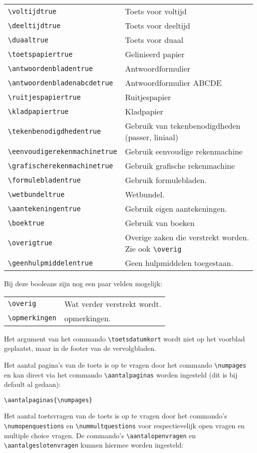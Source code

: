 \documentclass[12pt,dutch,addpoints,fleqn]{tisdexam}
\begin{document}
\begin{tabular}{lp{10cm}}
\verb|\voltijdtrue| & Toets voor voltijd \\
\verb|\deeltijdtrue| & Toets voor deeltijd \\
\verb|\duaaltrue| & Toets voor duaal \\
\verb|\toetspapiertrue| & Gelinieerd papier \\
\verb|\antwoordenbladentrue| & Antwoordformulier \\
\verb|\antwoordenbladenabcdetrue| & Antwoordformulier ABCDE \\
\verb|\ruitjespapiertrue| & Ruitjespapier \\
\verb|\kladpapiertrue| & Kladpapier \\
\verb|\tekenbenodigdhedentrue| & Gebruik van tekenbenodigdheden (passer, liniaal) \\
\verb|\eenvoudigerekenmachinetrue| & Gebruik eenvoudige rekenmachine \\ 
\verb|\grafischerekenmachinetrue| & Gebruik grafische rekenmachine \\
\verb|\formulebladentrue| & Gebruik formulebladen. \\
\verb|\wetbundeltrue| & Wetbundel. \\
\verb|\aantekeningentrue| & Gebruik eigen aantekeningen. \\
\verb|\boektrue| & Gebruik van boeken  \\
\verb|\overigtrue| & Overige zaken die verstrekt worden. Zie ook \verb|\overig| \\
\verb|\geenhulpmiddelentrue| & Geen hulpmiddelen toegestaan.
\end{tabular}


Bij deze booleans zijn nog een paar velden mogelijk:

\begin{tabular}{lp{15cm}}
\verb|\overig| & Wat verder verstrekt wordt. \\
\verb|\opmerkingen| & opmerkingen.
\end{tabular}

Het argument van het commando \verb|\toetsdatumkort| wordt niet op het voorblad
geplaatst, maar in de footer van de vervolgbladen.

Het aantal pagina's van de toets is op te vragen door het commando \verb|\numpages| en
kan direct via het commando \verb|\aantalpaginas| worden ingesteld (dit is bij default
al gedaan):

\verb|\aantalpaginas{\numpages}|

Het aantal toetsvragen van de toets is op te vragen door het commando's \verb|\numopenquestions| en
\verb|\nummultquestions| voor respectievelijk open vragen en multiple choice vragen.
De commando's \verb|\aantalopenvragen| en \verb|\aantalgeslotenvragen| kunnen hiermee worden ingesteld:
\end{document}
